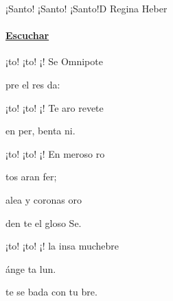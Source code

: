 \documentclass[12pt, spanish]{book}
\begin{document}
    \begin{song}{¡Santo! ¡Santo! ¡Santo!}{D}
        {} %
        {Regina Heber}
        {} %
        {}
        \ifChordBk
        \paragraph{\mbox{}\hfill\protect\href{https://open.spotify.com/intl-es/track/0AwD1ttPunQ8igtrUspp7G}{Escuchar}\mbox{}\hfill}
        \fi


        \begin{SBOpGroup}
            ¡to! ¡to! ¡! Se Omnipote

            pre el   res  da:

            ¡to! ¡to! ¡! Te aro revete

             en  per, benta ni.
        \end{SBOpGroup}
        \vskip 20pt
        \begin{SBOpGroup}
            ¡to! ¡to! ¡! En meroso ro

            tos   aran  fer;

             alea  y  coronas  oro

            den te el  gloso  Se.
        \end{SBOpGroup}
        \vskip 20pt
        \begin{SBOpGroup}
            ¡to! ¡to! ¡! la insa muchebre

             ánge    ta lun.

            te  se  bada con tu bre.


\end{SBOpGroup}
\end{song}
\end{document}
